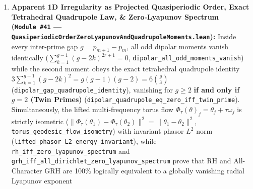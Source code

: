 \documentclass[
  11pt,
]{article}
\begin{document}
\begin{enumerate}
  for every \(X \in \mathbb{N}\)
  (\texttt{primeCounting\_eq\_limit\_trigRotor\_sum}) and exact
  multi-basin dipolar conservation
  (\texttt{multi\_basin\_dipolar\_conservation}). Furthermore, under
  \texttt{GeneralizedRiemannHypothesis}, \textbf{every} non-trivial zero
  \(s\) of \(\zeta(s)\) and of \textbf{every} primitive or imprimitive
  Dirichlet \(L(s, \chi)\) is proved to lie identically on the flat
  Clifford--Hopf equator (\(|z_1|^2 = |z_2|^2 = 1/2\), \(z_3 = 0\);
  \texttt{grh\_implies\_all\_dirichlet\_zeros\_on\_clifford\_hopf\_equator}),
  to satisfy the exact von Koch square-root modal envelope
  \(\|x^s\| = \sqrt{x}\) (\(x > 0\)) and \(\|n^{-s}\| = n^{-1/2}\)
  (\texttt{grh\_implies\_vonKoch\_sqrt\_modal\_envelope}), and to
  guarantee one-sided right-half-plane zero-freeness
  (\texttt{rh\_iff\_zeta\_zeroFree\_gt\_half},
  \texttt{grh\_iff\_all\_dirichlet\_zeroFree\_gt\_half}) together with
  complex differentiability of the Möbius reciprocal \(1/\zeta(s)\), the
  Liouville generating ratio \(\zeta(2s)/\zeta(s)\), and
  \(1/L(s, \chi)\) across \(\operatorname{Re}(s) > 1/2\)
  (\texttt{rh\_implies\_liouville\_and\_mobius\_holomorphic\_gt\_half},
  \texttt{grh\_implies\_nonprincipal\_inv\_LFunction\_holomorphic\_gt\_half}).
\item
  \textbf{Apparent 1D Irregularity as Projected Quasiperiodic Order,
  Exact Tetrahedral Quadrupole Law, \& Zero-Lyapunov Spectrum
  (\texttt{Module\ \#41} ---
  \texttt{QuasiperiodicOrderZeroLyapunovAndQuadrupoleMoments.lean}):}
  Inside every inter-prime gap \(g = p_{m+1} - p_m\), all odd dipolar
  moments vanish identically (\(\sum_{k=1}^{g-1}(g-2k)^{2r+1} = 0\),
  \texttt{dipolar\_all\_odd\_moments\_vanish}) while the second moment
  obeys the exact tetrahedral quadrupole identity
  \(3\sum_{k=1}^{g-1}(g-2k)^2 = g(g-1)(g-2) = 6\binom{g}{3}\)
  (\texttt{dipolar\_gap\_quadrupole\_identity}), vanishing for
  \(g \ge 2\) \textbf{if and only if \(g = 2\) (Twin Primes)}
  (\texttt{dipolar\_quadrupole\_eq\_zero\_iff\_twin\_prime}).
  Simultaneously, the lifted multi-frequency torus flow
  \(\Phi_\tau(\theta)_j = \theta_j + \tau\omega_j\) is strictly
  isometric
  (\(\|\Phi_\tau(\theta_1) - \Phi_\tau(\theta_2)\|^2 = \|\theta_1 - \theta_2\|^2\),
  \texttt{torus\_geodesic\_flow\_isometry}) with invariant phasor
  \(L^2\) norm (\texttt{lifted\_phasor\_L2\_energy\_invariant}), while
  \texttt{rh\_iff\_zero\_lyapunov\_spectrum} and
  \texttt{grh\_iff\_all\_dirichlet\_zero\_lyapunov\_spectrum} prove that
  RH and All-Character GRH are 100\% logically equivalent to a globally
  vanishing radial Lyapunov exponent

\end{enumerate}
\end{document}
